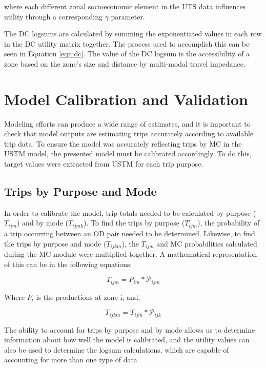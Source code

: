 \noindent where each different zonal socioeconomic element in the UTS data influences
utility through a corresponding $\gamma$ parameter.

The DC logsums are calculated by summing the exponentiated values in each row in the DC utility matrix
together. The process used to accomplish this can be seen
in Equation \ref{eqn:dc}. The value of the DC logsum is the accessibility of
a zone based on the zone's size and distance by multi-modal travel impedance.


\section{Model Calibration and Validation}

Modeling efforts can produce a wide range of estimates, and it is important to
check that model outputs are estimating trips accurately according to available trip data.
To ensure the model was accurately reflecting trips by MC in the USTM model,
the presented model  must be
calibrated accordingly. To do this, target values were extracted from
USTM for each trip purpose.

\subsection{Trips by Purpose and Mode}

In order to calibrate the model, trip totals needed to be calculated by purpose
(\(T_{ijm}\)) and by mode (\(T_{ijmk}\)). To find the trips by purpose
(\(T_{ijm}\)), the probability of a trip occurring between an OD pair needed to
be determined. Likewise, to find the trips by purpose and mode (\(T_{ijkm}\)),
the \(T_{ijm}\) and MC probabilities calculated during the MC
module were multiplied together. A mathematical representation of this can be in the following equations:

\begin{equation}
	T_{ijm} = P_{im} * \mathcal{P}_{ijm}
	\label{eqn:ij}
\end{equation}

\noindent Where $P_i$ is the productions at zone i, and,

\begin{equation}
	T_{ijkm} = T_{ijm} * \mathcal{P}_{ijk}
	\label{eqn:ijk}
\end{equation}

\noindent The ability to account for trips by purpose and by mode allows us to
determine information about how well the model is calibrated, and the utility
values can also be used to determine the logsum calculations, which are capable
of accounting for more than one type of data.


